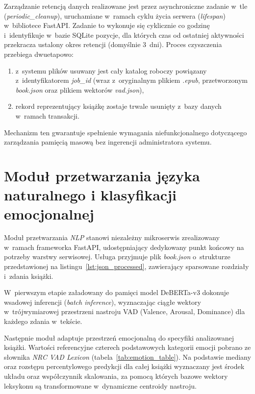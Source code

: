 Zarządzanie retencją danych realizowane jest przez asynchroniczne zadanie 
w~tle (\textit{periodic\_cleanup}), uruchamiane w~ramach cyklu życia serwera 
(\textit{lifespan}) w~bibliotece FastAPI. Zadanie to wykonuje się cyklicznie 
co godzinę i~identyfikuje w~bazie SQLite pozycje, dla których czas od ostatniej 
aktywności przekracza ustalony okres retencji (domyślnie 3~dni). Proces czyszczenia 
przebiega dwuetapowo:
\begin{enumerate}
    \item z~systemu plików usuwany jest cały katalog roboczy powiązany 
    z~identyfikatorem \textit{job\_id} (wraz z~oryginalnym plikiem \textit{.epub}, 
    przetworzonym \textit{book.json} oraz plikiem wektorów \textit{vad.json}),
    \item rekord reprezentujący książkę zostaje trwale usunięty z~bazy danych 
    w~ramach transakcji.
\end{enumerate}
Mechanizm ten gwarantuje spełnienie wymagania niefunkcjonalnego dotyczącego 
zarządzania pamięcią masową bez ingerencji administratora systemu.


\section{Moduł przetwarzania języka naturalnego i klasyfikacji emocjonalnej}
Moduł przetwarzania \textit{NLP} stanowi niezależny mikroserwis zrealizowany 
w~ramach frameworka FastAPI, udostępniający dedykowany punkt końcowy na 
potrzeby warstwy serwisowej. Usługa przyjmuje plik \textit{book.json} 
o~strukturze przedstawionej na listingu~\ref{lst:json_processed}, zawierający 
sparsowane rozdziały i~zdania książki.

W~pierwszym etapie załadowany do pamięci model DeBERTa-v3 dokonuje wsadowej 
inferencji (\textit{batch inference}), wyznaczając ciągłe wektory w~trójwymiarowej 
przestrzeni nastroju VAD (Valence, Arousal, Dominance) dla każdego zdania 
w~tekście. 

Następnie moduł adaptuje przestrzeń emocjonalną do specyfiki analizowanej 
książki. Wartości referencyjne czterech podstawowych kategorii emocji pobrano 
ze słownika \textit{NRC VAD Lexicon}\cite{VDA-leksykon} (tabela~\ref{tab:emotion_table}). 
Na podstawie mediany oraz rozstępu percentylowego predykcji dla całej książki 
wyznaczany jest środek układu oraz współczynnik skalowania, za pomocą których 
bazowe wektory leksykonu są transformowane w~dynamiczne centroidy nastroju.


